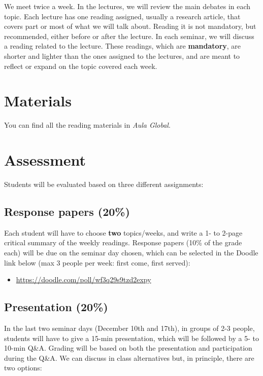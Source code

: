 \documentclass[12pt, a4paper]{article}
\begin{document}
We meet twice a week. In the lectures, we will review the main debates in each topic. Each lecture has one reading assigned, usually a research article, that covers part or most of what we will talk about. Reading it is not mandatory, but recommended, either before or after the lecture. In each seminar, we will discuss a reading related to the lecture. These readings, which are \textbf{mandatory}, are shorter and lighter than the ones assigned to the lectures, and are meant to reflect or expand on the topic covered each week.

\section{Materials}

You can find all the reading materials in \textit{Aula Global}.

\section{Assessment}

Students will be evaluated based on three different assignments:

\subsection*{Response papers (20\%)}

Each student will have to choose \textbf{two} topics/weeks, and write a 1- to 2-page critical summary of the weekly readings. Response papers (10\% of the grade each) will be due on the seminar day chosen, which can be selected in the Doodle link below (max 3 people per week: first come, first served):

\begin{itemize}
\setlength\itemsep{0pt}
\item[] \href{https://doodle.com/poll/wf3q29s9tzd2expy}{https://doodle.com/poll/wf3q29s9tzd2expy}
\end{itemize}

\subsection*{Presentation (20\%)}

In the last two seminar days (December 10th and 17th), in groups of 2-3 people, students will have to give a 15-min presentation, which will be followed by a 5- to 10-min Q\&A. Grading will be based on both the presentation and participation during the Q\&A. We can discuss in class alternatives but, in principle, there are two options:
\end{document}
